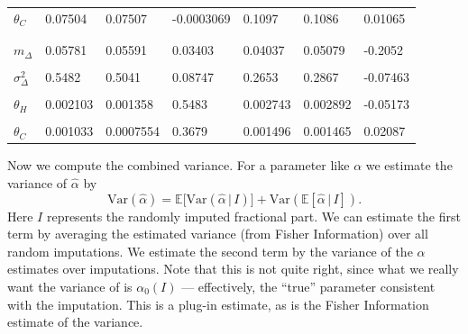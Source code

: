 \documentclass[
]{article}
\begin{document}
\begin{table}[!h]
\begin{tabular}[t]{lllllll}
\hspace{1em}$\theta_C$ & 0.07504 & 0.07507 & -0.0003069 & 0.1097 & 0.1086 & 0.01065\\
\addlinespace[0.3em]
\multicolumn{7}{l}{\textbf{Parameter SE estimates}}\\
\cellcolor{gray!6}{\hspace{1em}$m_M$} & \cellcolor{gray!6}{0.1608} & \cellcolor{gray!6}{0.1622} & \cellcolor{gray!6}{-0.00835} & \cellcolor{gray!6}{0.08506} & \cellcolor{gray!6}{0.05272} & \cellcolor{gray!6}{0.6136}\\
\hspace{1em}$m_\Delta$ & 0.05781 & 0.05591 & 0.03403 & 0.04037 & 0.05079 & -0.2052\\
\cellcolor{gray!6}{\hspace{1em}$\sigma^2_M$} & \cellcolor{gray!6}{4.395} & \cellcolor{gray!6}{4.827} & \cellcolor{gray!6}{-0.08949} & \cellcolor{gray!6}{1.218} & \cellcolor{gray!6}{1.486} & \cellcolor{gray!6}{-0.1803}\\
\hspace{1em}$\sigma^2_\Delta$ & 0.5482 & 0.5041 & 0.08747 & 0.2653 & 0.2867 & -0.07463\\
\cellcolor{gray!6}{\hspace{1em}$\alpha_H$} & \cellcolor{gray!6}{0.05649} & \cellcolor{gray!6}{0.03736} & \cellcolor{gray!6}{0.5121} & \cellcolor{gray!6}{0.06407} & \cellcolor{gray!6}{0.06849} & \cellcolor{gray!6}{-0.06442}\\
\hspace{1em}$\theta_H$ & 0.002103 & 0.001358 & 0.5483 & 0.002743 & 0.002892 & -0.05173\\
\cellcolor{gray!6}{\hspace{1em}$\alpha_C$} & \cellcolor{gray!6}{0.07439} & \cellcolor{gray!6}{0.05754} & \cellcolor{gray!6}{0.2929} & \cellcolor{gray!6}{0.08384} & \cellcolor{gray!6}{0.08321} & \cellcolor{gray!6}{0.007639}\\
\hspace{1em}$\theta_C$ & 0.001033 & 0.0007554 & 0.3679 & 0.001496 & 0.001465 & 0.02087\\
\bottomrule
\end{tabular}
\end{table}

Now we compute the combined variance. For a parameter like \(\alpha\) we estimate the variance of \(\hat\alpha\) by
\newcommand{\E}{\mathbb{E}}
\renewcommand{\P}{\mathbb{P}}
\[
  \mathrm{Var}(\hat\alpha) = \mathbb{E}\bigl[ \mathrm{Var}\left(\hat\alpha\, |\, I\right)\bigr] + \mathrm{Var}\left(\mathbb{E} \left[ \hat\alpha\, |\, I \right]\right).
\]
Here \(I\) represents the randomly imputed fractional part.
We can estimate the first term by averaging the estimated variance (from Fisher Information) over all random imputations.
We estimate the second term by the variance of the \(\alpha\) estimates over imputations. Note that this is not quite right, since what we really
want the variance of is \(\alpha_0(I)\) --- effectively, the ``true'' parameter consistent with the imputation. This is a plug-in estimate,
as is the Fisher Information estimate of the variance.
\end{document}
